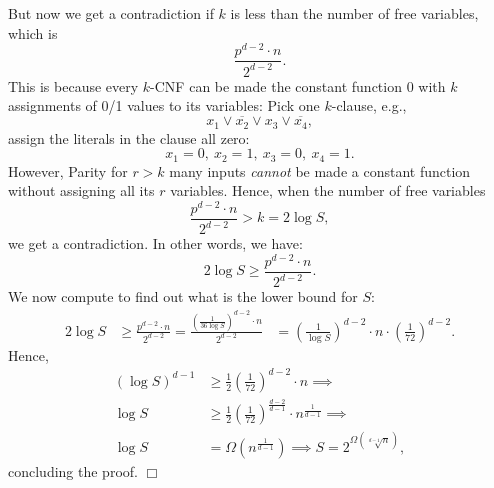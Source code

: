 But now we get a contradiction if \( k \) is less than the number of free variables, which is 
\[
\frac{p^{d-2} \cdot n}{2^{d-2}}.
\]
This is because every \( k \)-CNF can be made the  constant function 0 with \( k \) assignments of 0/1 values to its variables: Pick one \( k \)-clause, e.g.,
\[
x_1 \lor \overline{x_2} \lor x_3 \lor \overline{x_4},
\]
assign the literals in the clause all zero: 
\[
x_1 = 0, \ x_2 = 1, \ x_3 = 0, \ x_4 = 1.
\]
However, Parity for \( r > k \) many inputs \emph{cannot} be made a constant function without assigning all its \( r \) variables. Hence, when the number of free variables
\[
\frac{p^{d-2} \cdot n}{2^{d-2}} > k = 2 \log S,
\]
we get  a contradiction.
In other words, we have:
\[
2 \log S \geq \frac{p^{d-2} \cdot n}{2^{d-2}}.
\]
We now compute to find out what is the lower bound for $S$:
\begin{align*}
    2 \log S &\ge  \frac{p^{d-2} \cdot n}{2^{d-2}} 
 = \frac{\left(\frac{1}{36 \log S}\right)^{d-2} \cdot n}{2^{d-2}} 
    & = \left(\frac{1}{\log S}\right)^{d-2} \cdot n \cdot \left(\frac{1}{72}\right)^{d-2}.
\end{align*}
Hence, 
\begin{align*}
    \left(\log S\right)^{d-1} &\ge \frac{1}{2} \left(\frac{1}{72}\right)^{d-2} \cdot n \implies \\
    \log S &\ge \frac{1}{2} \left(\frac{1}{72}\right)^{\frac{d-2}{d-1}} \cdot n^{\frac{1}{d-1}} \implies \\
    \log S &= \Omega \left(n^{\frac{1}{d-1}}\right) \implies 
    S= 2^{\Omega ({\sqrt[d-1]{n}})},
\end{align*}
concluding the proof. 
 \hfill $\Box$

% 
% 
% 
% 
% 
% 
% 
% 
% 
% 
% 
% 
% 
% 
% 
% 
 
